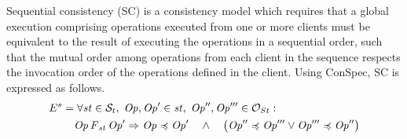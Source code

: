 \documentclass[acmlarge, ,11pt]{acmart}
\begin{document}
 Sequential consistency (SC) is a consistency model which requires that a global execution comprising operations executed from one or more clients must be equivalent to the result of executing the operations in a sequential order, such that the mutual order among operations from each client in the sequence respects the invocation order of the operations defined in the client.  Using ConSpec, SC  is expressed as follows.
%
\begin{align}\label{eqn:SC}
\begin{split}
    E^{s} =  & \; \forall \mathit{st} \in \mathcal{S}_t, \; {\mathit{Op}}, {\mathit{Op}}' \in \mathit{st}, \; {\mathit{Op}}'', {\mathit{Op}}''' \in \mathcal{O}_{St} : \\
& \mathit{Op} \operatorname{\it F}_\mathit{st} {\mathit{Op}}' \Rightarrow  {\mathit{Op}} \preccurlyeq {\mathit{Op}}' \quad \wedge \quad
\left({\mathit{Op}}'' \preccurlyeq {\mathit{Op}}'''  \vee  {\mathit{Op}}'''  \preccurlyeq {\mathit{Op}}''\right)
\end{split}
\end{align}
\end{document}
